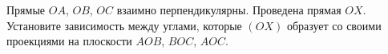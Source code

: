 Прямые $OA$, $OB$, $OC$ взаимно перпендикулярны. Проведена прямая $OX$. Установите зависимость между углами, которые $(OX)$ образует со своими проекциями на плоскости $AOB$, $BOC$, $AOC$.